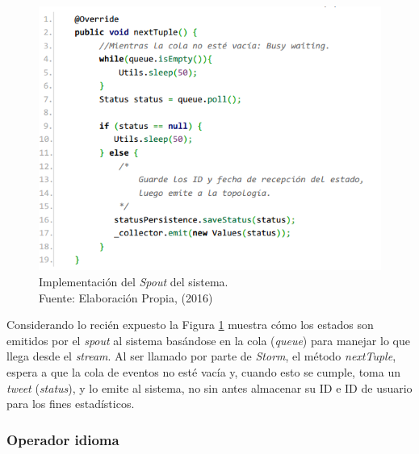 \begin{figure}[H]
	\centering
	\captionsetup{justification=centering}
	\includegraphics[scale=0.8]{images/TwitterSpout.png}
	\caption[Implementación del \textit{Spout} del sistema.]{Implementación del \textit{Spout} del sistema.\\Fuente: Elaboración Propia, (2016)}
	\label{fig:TwitterSpout}
\end{figure}

Considerando lo recién expuesto la Figura \ref{fig:TwitterSpout} muestra cómo los estados son emitidos por el \textit{spout} al sistema basándose en la cola (\textit{queue}) para manejar lo que llega desde el \textit{stream}. Al ser llamado por parte de \textit{Storm}, el método \textit{nextTuple}, espera a que la cola de eventos no esté vacía y, cuando esto se cumple, toma un \textit{tweet} (\textit{status}), y lo emite al sistema, no sin antes almacenar su ID e ID de usuario para los fines estadísticos.

\subsubsection*{Operador idioma}
\label{subsubsec:1op}

